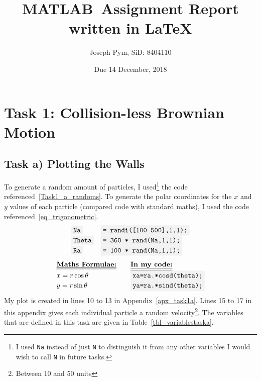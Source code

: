 \documentclass[10pt,a4paper]{article}
\title{MATLAB\textregistered\ Assignment Report written in  \LaTeX}
\author{Joseph Pym, SiD: 8404110}
\date{Due 14 December, 2018}
\newcommand{\code}[1]{\colorbox{light-gray}{\texttt{#1}}}
\begin{document}
	\maketitle
	\tableofcontents{}
	\pagebreak
	\section{Task 1: Collision-less Brownian Motion} %
	\subsection{Task a) Plotting the Walls}
	\label{Section1a}
	To generate a random amount of particles, I used\footnote{I used \code{Na} instead of just \code{N} to distinguish it from any other variables I would wish to call \code{N} in future tasks.} the code referenced~\ref{Task1_a_randoms}. To generate the polar coordinates for the $x$ and $y$ values of each particle (compared code with standard maths), I used the code referenced~\ref{eq_trigonometric}.
	\begin{equation} %
	\label{Task1_a_randoms}
	\begin{array}{ll}
	\code{Na}  &\code{= randi([100 500],1,1);}\\
	\code{Theta} &\code{= 360 * rand(Na,1,1);}\\
	\code{Ra}&\code{= 100 * rand(Na,1,1);}
	\end{array}
	\end{equation}
	\begin{equation} %
	\label{eq_trigonometric}
	\begin{array}{llllll}
	
	\text{\textbf{\underline{\underline{{Maths Formulae:}}}}} && \text{\textbf{\underline{\underline{In my code:}}}}\\
	x=r \cos \theta & &			\code{xa=ra.*cosd(theta);}\\
	y=r\sin\theta & &				\code{ya=ra.*sind(theta);}
	\end{array}
	\end{equation}
	My plot is created in lines 10 to 13 in Appendix~\ref{apx_task1a}. Lines 15 to 17 in this appendix gives each individual particle a random velocity\footnote{Between 10 and 50 units}. The variables that are defined in this task are given in Table~\ref{tbl_variablestaska}.
\end{document}
